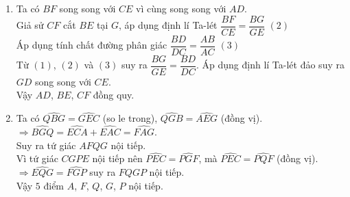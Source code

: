 \begin{ex}
{\begin{enumerate}
$\widehat{ACE}=\widehat{CAE}=\dfrac{1}{2}\widehat{BAC}$ nên $\triangle ABF\backsim\triangle ACE$  (g.g)\\
$\Rightarrow \dfrac{BF}{CE}=\dfrac{AB}{AC}\quad (1).$
\item Ta có $BF$ song song với $ CE$ vì cùng song song với $AD$.\\
Giả sử $CF$ cắt $BE$ tại $G$, áp dụng định lí Ta-lét $\dfrac{BF}{CE}=\dfrac{BG}{GE}$ $(2)$\\
Áp dụng tính chất đường phân giác $\dfrac{BD}{DC}=\dfrac{AB}{AC}$ $(3)$\\
Từ $(1)$, $(2)$ và $(3)$ suy ra $\dfrac{BG}{GE}=\dfrac{BD}{DC}$. Áp dụng định lí Ta-lét đảo suy ra $GD$ song song với $CE$.\\
Vậy $AD$, $BE$, $CF$ đồng quy.
\item Ta có $\widehat{QBG}=\widehat{GEC}$ (so le trong), $\widehat{QGB}=\widehat{AEG}$ (đồng vị).\\
$\Rightarrow \widehat{BGQ}=\widehat{ECA}+\widehat{EAC}=\widehat{FAG}$.\\
Suy ra tứ giác $AFQG$ nội tiếp.\\
Vì tứ giác $CGPE$ nội tiếp nên $\widehat{PEC}=\widehat{PGF}$, mà $\widehat{PEC}=\widehat{PQF}$ (đồng vị).\\
$\Rightarrow\widehat{EQG}=\widehat{FGP}$ suy ra $FQGP$ nội tiếp.\\
Vậy $5$ điểm $A$, $F$, $Q$, $G$, $P$ nội tiếp. 
\end{enumerate}
}
\end{ex}

